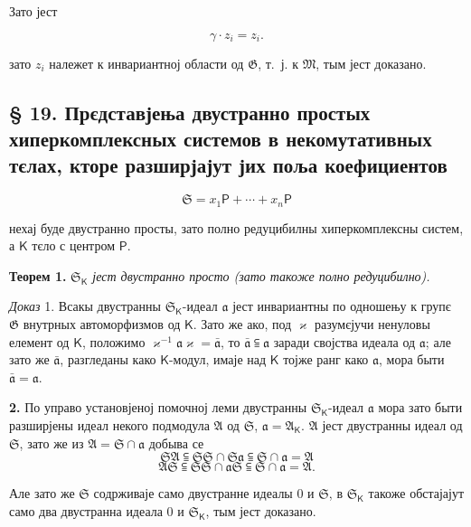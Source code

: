 \documentclass[11pt]{article}
\begin{document}
Зато јест

\[
\gamma\cdot z_i=z_i.
\]

зато \(z_i\) належет к инвариантној области од \(\mathfrak G\), т.~ј. к \(\mathfrak M\), тым јест доказано.

\subsection*{§ 19. Прєдставјења двустранно простых хиперкомплексных системов в некомутативных тєлах, кторе разширјајут јих поља коефициентов}\label{darstellungen-zweiseitig-einfacher-hyperkomplexer-systeme-in-nichtkommutativen-erweiterungskoerpern-ihrer-koeffizientenkoerper}

\[
\mathfrak S=x_1\mathsf P+\cdots+x_n\mathsf P
\]

нехај буде двустранно просты, зато полно редуцибилны хиперкомплексны систем, а \(\mathsf K\) тєло с центром \(\mathsf P\).

\textbf{Теорем 1.} \emph{\(\mathfrak S_{\mathsf K}\) јест двустранно просто (зато такоже полно редуцибилно).}

\emph{Доказ} 1. Всакы двустранны \(\mathfrak S_{\mathsf K}\)-идеал \(\mathfrak a\) јест инвариантны по одношењу к групє \(\mathfrak G\) внутрных автоморфизмов од \(\mathsf K\). Зато же ако, под \(\varkappa\) разумєјучи ненуловы елемент од \(\mathsf K\), положимо \(\varkappa^{-1}\mathfrak a\varkappa=\bar{\mathfrak a}\), то \(\bar{\mathfrak a}\subseteqq\mathfrak a\) заради својства идеала од \(\mathfrak a\); але зато же \(\bar{\mathfrak a}\), разгледаны како \(\mathsf K\)-модул, имаје над \(\mathsf K\) тојже ранг како \(\mathfrak a\), мора быти \(\bar{\mathfrak a}=\mathfrak a\).

\textbf{2.} По управо установјеној помочној леми двустранны \(\mathfrak S_{\mathsf K}\)-идеал \(\mathfrak a\) мора зато быти разширјены идеал некого подмодула \(\mathfrak A\) од \(\mathfrak S\), \(\mathfrak a=\mathfrak A_{\mathsf K}\). \(\mathfrak A\) јест двустранны идеал од \(\mathfrak S\), зато же из \(\mathfrak A=\mathfrak S\cap\mathfrak a\) добыва се
\[
\mathfrak S\mathfrak A\subseteqq\mathfrak S\mathfrak S\cap\mathfrak S\mathfrak a\subseteqq\mathfrak S\cap\mathfrak a=\mathfrak A
\]
\[
\mathfrak A\mathfrak S\subseteqq\mathfrak S\mathfrak S\cap\mathfrak a\mathfrak S\subseteqq\mathfrak S\cap\mathfrak a=\mathfrak A.
\]

Але зато же \(\mathfrak S\) содрживаје само двустранне идеалы 0 и \(\mathfrak S\), в \(\mathfrak S_{\mathsf K}\) такоже обстајајут само два двустранна идеала 0 и \(\mathfrak S_{\mathsf K}\), тым јест доказано.
\end{document}
